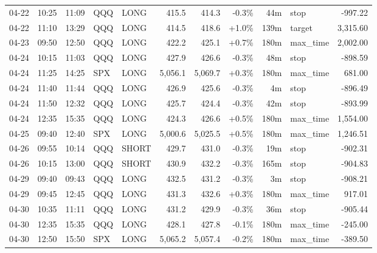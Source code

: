 \documentclass[11pt,a4paper,twoside]{article}
\begin{document}
\begin{center}
\begin{longtable}{>{\color{txtmain}}l l l l l r r r r >{\color{txtmain}}l r}
04-22 & 10:25 & 11:09 & QQQ & LONG & 415.5 & 414.3 & \textcolor{lossred}{-0.3\%} & 44m & stop & \textcolor{lossred}{-997.22} \\
04-22 & 11:10 & 13:29 & QQQ & LONG & 414.5 & 418.6 & \textcolor{wingreen}{+1.0\%} & 139m & target & \textcolor{wingreen}{3,315.60} \\
04-23 & 09:50 & 12:50 & QQQ & LONG & 422.2 & 425.1 & \textcolor{wingreen}{+0.7\%} & 180m & max\_time & \textcolor{wingreen}{2,002.00} \\
04-24 & 10:15 & 11:03 & QQQ & LONG & 427.9 & 426.6 & \textcolor{lossred}{-0.3\%} & 48m & stop & \textcolor{lossred}{-898.59} \\
04-24 & 11:25 & 14:25 & SPX & LONG & 5,056.1 & 5,069.7 & \textcolor{wingreen}{+0.3\%} & 180m & max\_time & \textcolor{wingreen}{681.00} \\
04-24 & 11:40 & 11:44 & QQQ & LONG & 426.9 & 425.6 & \textcolor{lossred}{-0.3\%} & 4m & stop & \textcolor{lossred}{-896.49} \\
04-24 & 11:50 & 12:32 & QQQ & LONG & 425.7 & 424.4 & \textcolor{lossred}{-0.3\%} & 42m & stop & \textcolor{lossred}{-893.99} \\
04-24 & 12:35 & 15:35 & QQQ & LONG & 424.3 & 426.6 & \textcolor{wingreen}{+0.5\%} & 180m & max\_time & \textcolor{wingreen}{1,554.00} \\
04-25 & 09:40 & 12:40 & SPX & LONG & 5,000.6 & 5,025.5 & \textcolor{wingreen}{+0.5\%} & 180m & max\_time & \textcolor{wingreen}{1,246.51} \\
04-26 & 09:55 & 10:14 & QQQ & SHORT & 429.7 & 431.0 & \textcolor{lossred}{-0.3\%} & 19m & stop & \textcolor{lossred}{-902.31} \\
04-26 & 10:15 & 13:00 & QQQ & SHORT & 430.9 & 432.2 & \textcolor{lossred}{-0.3\%} & 165m & stop & \textcolor{lossred}{-904.83} \\
04-29 & 09:40 & 09:43 & QQQ & LONG & 432.5 & 431.2 & \textcolor{lossred}{-0.3\%} & 3m & stop & \textcolor{lossred}{-908.21} \\
04-29 & 09:45 & 12:45 & QQQ & LONG & 431.3 & 432.6 & \textcolor{wingreen}{+0.3\%} & 180m & max\_time & \textcolor{wingreen}{917.01} \\
04-30 & 10:35 & 11:11 & QQQ & LONG & 431.2 & 429.9 & \textcolor{lossred}{-0.3\%} & 36m & stop & \textcolor{lossred}{-905.44} \\
04-30 & 12:35 & 15:35 & QQQ & LONG & 428.1 & 427.8 & \textcolor{lossred}{-0.1\%} & 180m & max\_time & \textcolor{lossred}{-245.00} \\
04-30 & 12:50 & 15:50 & SPX & LONG & 5,065.2 & 5,057.4 & \textcolor{lossred}{-0.2\%} & 180m & max\_time & \textcolor{lossred}{-389.50} \\

\end{longtable}
\end{center}
\end{document}
